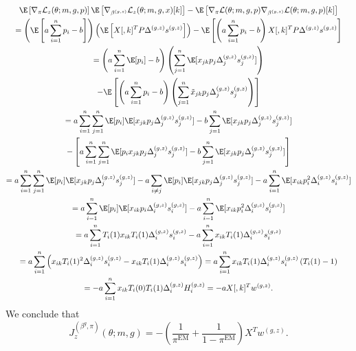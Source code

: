 \documentclass[12pt]{article}
\begin{document}
\begin{multline*}
\E \left[ \nabla_\pi \mathcal{L}_z(\theta; m, g, p) \right] \E\left[\nabla_{\beta^{(g, z)}} \mathcal{L}_z(\theta; m, g, x)[k] \right] - \E \left[\nabla_{\pi}\mathcal{L}(\theta; m,g,p) \nabla_{\beta^{(g,z)}} \mathcal{L} (\theta; m,g,p)[k] \right] \\= \left(\E \left[ a \sum_{i=1}^n p_i - b \right] \right)\left( \E \left[{X}[,k]^T P \Delta^{(g,z)} s^{(g,z)} \right]\right) - \E \left[ \left( a \sum_{i=1}^n p_i - b \right) {X}[,k]^T P \Delta^{(g,z)} s^{(g,z)}\right] \\ = \left( a \sum_{i=1}^n \E[p_i] - b \right) \left( \sum_{j=1}^n \E [x_{jk} p_j \Delta^{(g,z)}_j s^{(g,z)}_j] \right) \\ - \E \left[ \left( a \sum_{i=1}^n p_i - b \right) \left( \sum_{j=1}^n \tilde{x}_{jk} p_j \Delta^{(g,z)}_j s^{(g,z)}_j \right) \right] \\= a \sum_{i=1}^n \sum_{j=1}^n \E [p_i] \E[x_{jk} p_j \Delta^{(g,z)}_j s^{(g,z)}_j] - b \sum_{j=1}^n \E[x_{jk} p_j \Delta^{(g,z)}_j s^{(g,z)}_j] \\ - \left[a \sum_{i=1}^n \sum_{j=1}^n \E [ p_i x_{jk} p_j \Delta^{(g,z)}_j s^{(g,z)}_j] - b \sum_{j=1}^n \E[x_{jk} p_j \Delta^{(g,z)}_j s^{(g,z)}_j] \right] \\ = a \sum_{i=1}^n \sum_{j=1}^n \E[p_i] \E[{x}_{jk} p_j \Delta^{(g,z)}_j s^{(g,z)}_j] - a \sum_{i \neq j} \E[p_i] \E[x_{jk} p_j \Delta^{(g,z)}_j s^{(g,z)}_j] - a \sum_{i=1}^n \E[ x_{ik} p_i^2 \Delta^{(g,z)}_i s^{(g,z)}_i] \\ = a \sum_{i=1}^n \E[p_i] \E[x_{ik} p_i \Delta^{(g,z)}_i s^{(g,z)}_i] - a \sum_{i=1}^n \E[x_{ik} p_i^2 \Delta^{(g,z)}_i s^{(g,z)}_i] \\ = a \sum_{i=1}^n T_i(1) x_{ik} T_i(1) \Delta^{(g,z)}_i s^{(g,z)}_i - a \sum_{i=1}^n x_{ik} T_i(1) \Delta^{(g,z)}_i s^{(g,z)}_i \\ = a \sum_{i=1}^n \left( {x}_{ik} T_i(1)^2 \Delta^{(g,z)}_i s^{(g,z)}_i - x_{ik} T_i(1) \Delta^{(g,z)}_i s^{(g,z)}_i \right) = a \sum_{i=1}^n {x}_{ik}T_i(1)\Delta^{(g,z)}_i s^{(g,z)}_i \left( T_i(1) - 1\right) \\ = -a\sum_{i=1}^n x_{ik} T_i(0) T_i(1)\Delta^{(g,z)}_i H^{(g,z)}_i = -a X[,k]^T w^{(g,z)}.
\end{multline*}
We conclude that
\begin{equation}\label{sub_mat_5_formula} J^{(\beta^g, \pi)}_z(\theta; m, g) = -\left( \frac{1}{\pi^\textrm{EM}} + \frac{1}{1-\pi^\textrm{EM}} \right)X^T w^{(g,z)}. \end{equation}
\end{document}
